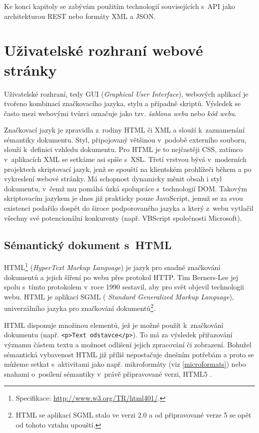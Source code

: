 Ke konci kapitoly se zabývám použitím technologií souvisejících s~API
jako architekturou REST nebo formáty XML a JSON.

\section{Uživatelské rozhraní webové stránky}\label{gui}
Uživatelské rozhraní, tedy GUI ({\it Graphical User Interface}),
webových aplikací je tvořeno kombinací značkovacího jazyka, stylu a
případně skriptů. Výsledek se často mezi webovými tvůrci označuje
jako tzv. {\it šablona webu} nebo {\it kód webu}.

Značkovací jazyk je zpravidla z~rodiny HTML či XML a slouží
k~zaznamenání sémantiky dokumentu. Styl, připojovaný většinou v~podobě
externího souboru, slouží k~definici vzhledu dokumentu. Pro HTML je
to nej\-častěji CSS, zatímco v~aplikacích XML se setkáme asi spíše
s~XSL. Třetí vrstvou bývá v~moderních projektech skriptovací
jazyk, jenž se spouští na klientském prohlížeči během a po vykreslení
webové stránky. Má schopnost dynamicky měnit obsah i styl dokumentu,
v~čemž mu pomáhá úzká spolupráce s~technologií DOM. Takovým skriptovacím
jazykem je dnes již prakticky pouze JavaScript, jemuž se za svou
existenci podařilo dospět do široce podporovaného jazyka a který
z~webu vytlačil všechny své potencionální konkurenty (např. VBScript
společnosti Microsoft).

\subsection{Sémantický dokument s~HTML}
HTML\footnote{Specifikace: \url{http://www.w3.org/TR/html401/}.}
({\it HyperText Markup Language}) je jazyk pro snadné značkování dokumentů a
jejich šíření po webu přes protokol HTTP. Tim
Berners-Lee jej spolu s~tímto protokolem v~roce 1990 sestavil, aby
pro svět objevil technologii webu. HTML je aplikací SGML ({\it
Standard Generalized Markup Language}), univerzálního jazyka pro značkování
dokumentů\footnote{HTML se aplikací SGML stalo ve verzi 2.0 a od
připravované verze 5 se opět od tohoto vztahu upouští.}.
\cite{htmlHistory}

HTML disponuje množinou elementů, jež je možné použít k~značkování
dokumentu (např. {\tt <p>Text odstavce</p>}). To má za výsledek
přiřazování významu částem textu a možnost odlišení jejich zpracování
či zobrazení. Bohužel sémantická vybavenost HTML již příliš
nepostačuje dnešním potřebám a proto se můžeme setkat s~aktivitami
jako např. mikroformáty (viz \ref{microformats}) nebo snahami
o~posílení sémantiky v~právě připravované verzi, HTML5 \cite{html5}.

